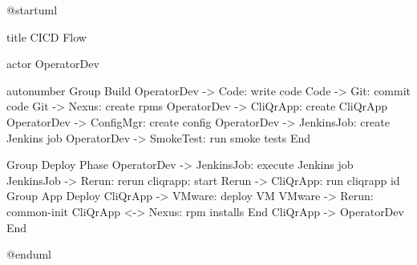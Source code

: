 @startuml

title CICD Flow

actor OperatorDev

autonumber
Group Build
  OperatorDev -> Code: write code
  Code -> Git: commit code
  Git -> Nexus: create rpms
  OperatorDev -> CliQrApp: create CliQrApp
  OperatorDev -> ConfigMgr: create config
  OperatorDev -> JenkinsJob: create Jenkins job
  OperatorDev -> SmokeTest: run smoke tests
End

Group Deploy Phase
  OperatorDev -> JenkinsJob: execute Jenkins job
  JenkinsJob -> Rerun: rerun cliqrapp: start
  Rerun -> CliQrApp: run cliqrapp id
  Group App Deploy
    CliQrApp -> VMware: deploy VM
    VMware -> Rerun: common-init
    CliQrApp <-> Nexus: rpm installs
  End
  CliQrApp -> OperatorDev
End


@enduml
